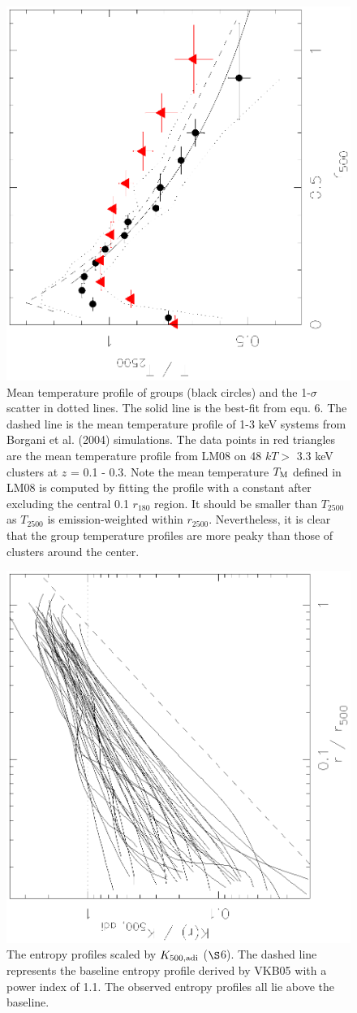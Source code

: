 \documentclass{aastex}
\begin{document}
\begin{figure}
\vspace{-1.2cm}
\centerline{\includegraphics[height=0.5\linewidth,angle=270]{f9.ps}}
  \caption{Mean temperature profile of groups (black circles) and the 1-$\sigma$ scatter
in dotted lines. The solid line is the best-fit from equ. 6. The dashed
line is the mean temperature profile of 1-3 keV systems from Borgani et al.
(2004) simulations. The data points in red triangles are the mean temperature
profile from LM08 on 48 $kT >$ 3.3 keV clusters
at $z$ = 0.1 - 0.3. Note the mean temperature $T_{\rm M}$ defined in
LM08 is computed by fitting the profile with a constant after excluding the
central 0.1 $r_{180}$ region. It should be smaller than $T_{2500}$ as
$T_{2500}$ is emission-weighted within $r_{2500}$.
Nevertheless, it is clear that the group temperature profiles are more
peaky than those of clusters around the center.
}
\end{figure}
\clearpage

\begin{figure}
\centerline{\includegraphics[height=0.4\linewidth,angle=270]{f10.ps}}
  \caption{The entropy profiles scaled by $K_{\rm 500, adi}$ ($\S$6).
The dashed line represents the baseline entropy profile derived by VKB05
with a power index of 1.1.
The observed entropy profiles all lie above the baseline.
}
\end{figure}
\end{document}
